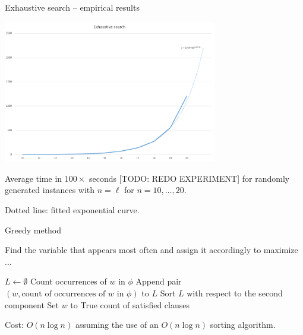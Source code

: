 \documentclass[12pt]{beamer}
\begin{document}
\begin{frame}
{Exhaustive search -- empirical results}

\begin{center}
\includegraphics[width=0.7\textwidth]{img/exh2}
\end{center}

Average time in $100\times$ seconds [TODO: REDO EXPERIMENT] for randomly generated instances with $n=\ell$ for $n=10,\ldots,20$.

Dotted line: fitted exponential curve.

\end{frame}

\begin{frame}
{Greedy method}

Find the variable that appears most often and assign it accordingly to maximize ...


\begin{algorithmic}[1]\sffamily
	\State $L \gets \emptyset$
		\State Count occurrences of $w$ in $\phi$
		\State Append pair $(w, \text{count of occurrences of $w$ in $\phi$})$ to $L$
	\EndFor
	\State Sort $L$ with respect to the second component
		\State Set $w$ to True 
	\EndFor
	\State \Return count of satisfied clauses
\end{algorithmic}

\vfill

Cost: $O(n\log n)$ assuming the use of an $O(n\log n)$ sorting algorithm.
\end{frame}
\end{document}
